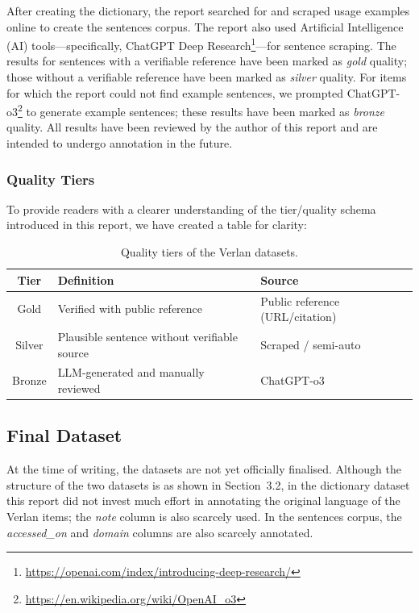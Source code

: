 \documentclass[12pt]{article}
\begin{document}
After creating the dictionary, the report searched for and scraped usage examples online to create the sentences corpus. The report also used Artificial Intelligence (AI) tools\;---\;specifically, ChatGPT Deep Research\footnote{\url{https://openai.com/index/introducing-deep-research/}}\;---\;for sentence scraping. The results for sentences with a verifiable reference have been marked as \textit{gold} quality; those without a verifiable reference have been marked as \textit{silver} quality. For items for which the report could not find example sentences, we prompted ChatGPT-o3\footnote{\url{https://en.wikipedia.org/wiki/OpenAI_o3}} to generate example sentences; these results have been marked as \textit{bronze} quality. All results have been reviewed by the author of this report and are intended to undergo annotation in the future.

\subsubsection{Quality Tiers}

To provide readers with a clearer understanding of the tier/quality schema introduced in this report, we have created a table for clarity:

\begin{table}[H]
\centering
\caption{Quality tiers of the Verlan datasets.}
\begin{tabular}{c|l|l}
\hline
\textbf{Tier} & \textbf{Definition} & \textbf{Source} \\
\hline
Gold   & Verified with public reference & Public reference (URL/citation) \\
Silver & Plausible sentence without verifiable source & Scraped / semi-auto \\
Bronze & LLM-generated and manually reviewed & ChatGPT-o3 \\
\hline
\end{tabular}
\label{tab:verlan_tiers}
\end{table}


\subsection{Final Dataset}

At the time of writing, the datasets are not yet officially finalised. Although the structure of the two datasets is as shown in Section~3.2, in the dictionary dataset this report did not invest much effort in annotating the original language of the Verlan items; the \textit{note} column is also scarcely used. In the sentences corpus, the \textit{accessed\_on} and \textit{domain} columns are also scarcely annotated. 
\end{document}

